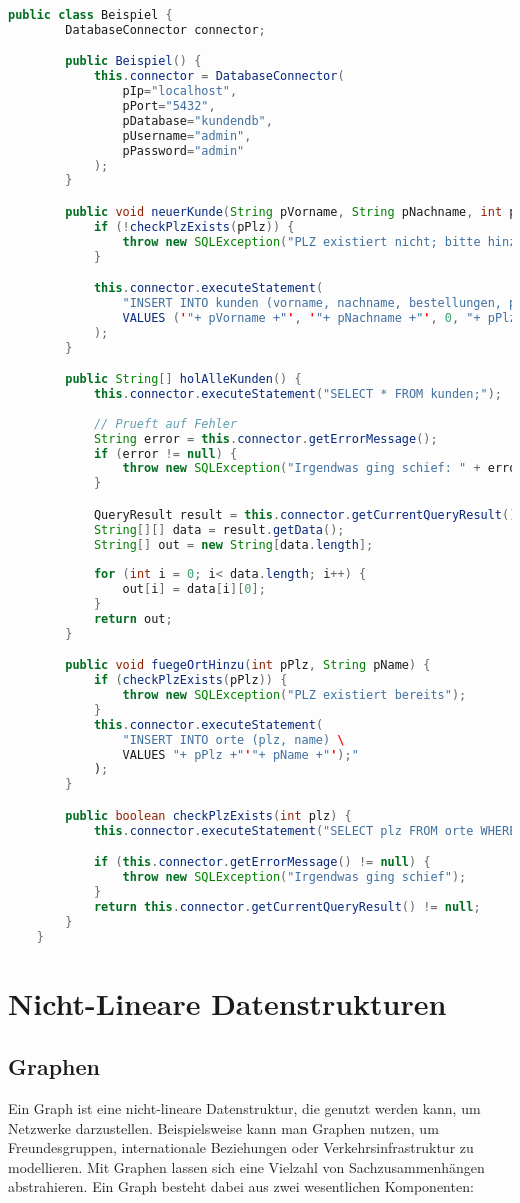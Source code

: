 \documentclass{article}
\begin{document}
	\begin{lstlisting}[language=Java]
	public class Beispiel {
		DatabaseConnector connector;

		public Beispiel() {
			this.connector = DatabaseConnector(
				pIp="localhost",
				pPort="5432",
				pDatabase="kundendb",
				pUsername="admin",
				pPassword="admin"
			);
		}

		public void neuerKunde(String pVorname, String pNachname, int pPlz) {
			if (!checkPlzExists(pPlz)) {
				throw new SQLException("PLZ existiert nicht; bitte hinzufuegen");
			}

			this.connector.executeStatement(
				"INSERT INTO kunden (vorname, nachname, bestellungen, plz) \
				VALUES ('"+ pVorname +"', '"+ pNachname +"', 0, "+ pPlz +");"
			);
		}

		public String[] holAlleKunden() {
			this.connector.executeStatement("SELECT * FROM kunden;");
		
			// Prueft auf Fehler
			String error = this.connector.getErrorMessage();
			if (error != null) {
				throw new SQLException("Irgendwas ging schief: " + error);
			}

			QueryResult result = this.connector.getCurrentQueryResult();
			String[][] data = result.getData();
			String[] out = new String[data.length];
		
			for (int i = 0; i< data.length; i++) {
				out[i] = data[i][0];
			}
			return out;
		}

		public void fuegeOrtHinzu(int pPlz, String pName) {
			if (checkPlzExists(pPlz)) {
				throw new SQLException("PLZ existiert bereits");
			}
			this.connector.executeStatement(
				"INSERT INTO orte (plz, name) \
				VALUES "+ pPlz +"'"+ pName +"');"
			);
		}

		public boolean checkPlzExists(int plz) {
			this.connector.executeStatement("SELECT plz FROM orte WHERE plz = " + String.valueOf(plz) + ";");

			if (this.connector.getErrorMessage() != null) {
				throw new SQLException("Irgendwas ging schief");
			}
			return this.connector.getCurrentQueryResult() != null;
		}
	}
	\end{lstlisting}


	\section{Nicht-Lineare Datenstrukturen}

	\subsection{Graphen}
	Ein Graph ist eine nicht-lineare Datenstruktur, die genutzt werden kann, um Netzwerke darzustellen. Beispielsweise kann man Graphen nutzen, um Freundesgruppen, internationale Beziehungen oder Verkehrsinfrastruktur zu modellieren. Mit Graphen lassen sich eine Vielzahl von Sachzusammenhängen abstrahieren.
	Ein Graph besteht dabei aus zwei wesentlichen Komponenten:
\end{document}
